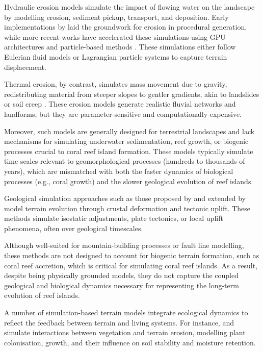 
Hydraulic erosion models simulate the impact of flowing water on the landscape by modelling erosion, sediment pickup, transport, and deposition. Early implementations by \cite{Musgrave1989} laid the groundwork for erosion in procedural generation, while more recent works have accelerated these simulations using GPU architectures \cite{Mei2007} and particle-based methods \cite{Neidhold2005}. These simulations either follow Eulerian fluid models or Lagrangian particle systems to capture terrain displacement.

Thermal erosion, by contrast, simulates mass movement due to gravity, redistributing material from steeper slopes to gentler gradients, akin to landslides or soil creep \cite{Benes2006}. These erosion models generate realistic fluvial networks and landforms, but they are parameter-sensitive and computationally expensive.

Moreover, such models are generally designed for terrestrial landscapes and lack mechanisms for simulating underwater sedimentation, reef growth, or biogenic processes crucial to coral reef island formation. These models typically simulate time scales relevant to geomorphological processes (hundreds to thousands of years), which are mismatched with both the faster dynamics of biological processes (e.g., coral growth) and the slower geological evolution of reef islands.


Geological simulation approaches such as those proposed by \cite{Cordonnier2016, Cordonnier2017a} and extended by \cite{Schott2023} model terrain evolution through crustal deformation and tectonic uplift. These methods simulate isostatic adjustments, plate tectonics, or local uplift phenomena, often over geological timescales.

Although well-suited for mountain-building processes or fault line modelling, these methods are not designed to account for biogenic terrain formation, such as coral reef accretion, which is critical for simulating coral reef islands. As a result, despite being physically grounded models, they do not capture the coupled geological and biological dynamics necessary for representing the long-term evolution of reef islands.


A number of simulation-based terrain models integrate ecological dynamics to reflect the feedback between terrain and living systems. For instance, \cite{Ecormier-Nocca2021} and \cite{Cordonnier2017b} simulate interactions between vegetation and terrain erosion, modelling plant colonisation, growth, and their influence on soil stability and moisture retention.

